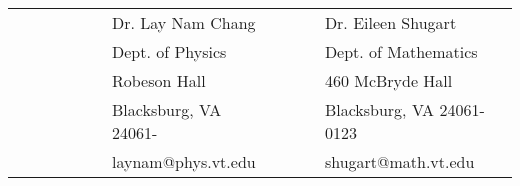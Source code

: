 \documentclass[10pt]{article}
\begin{document}
\newline

\begin{tabular}{llllllllllll}
&&&&&&Dr. Lay Nam Chang&&&&Dr. Eileen Shugart\\
&&&&&&Dept. of Physics&&&&Dept. of Mathematics\\
&&&&&&Robeson Hall&&&&460 McBryde Hall\\
&&&&&&Blacksburg, VA 24061-&&&&Blacksburg, VA 24061-0123\\
&&&&&&laynam@phys.vt.edu&&&&shugart@math.vt.edu\\
\end{tabular}
\newline
 
\end{document}

